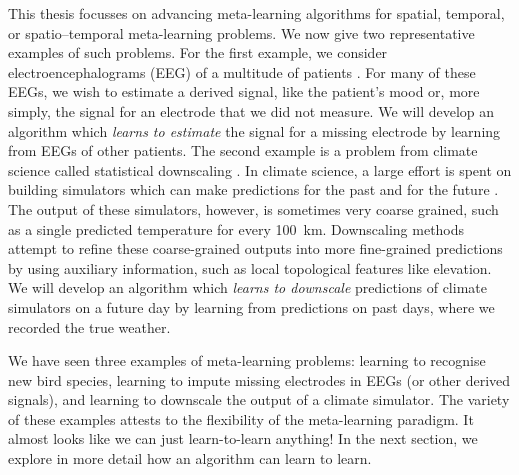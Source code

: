 \documentclass[12pt, twoside]{report}
\begin{document}
This thesis focusses on advancing meta-learning algorithms for spatial, temporal, or spatio--temporal meta-learning problems. %
We now give two representative examples of such problems.
For the first example, we consider electroencephalograms (EEG) of a multitude of patients \parencite{Zhang:1995:Event_Related_Potentials_During_Object}.
For many of these EEGs, we wish to estimate a derived signal, like the patient's mood or, more simply, the signal for an electrode that we did not measure.
We will develop an algorithm which \emph{learns to estimate} the signal for a missing electrode %
by learning from EEGs of other patients.
The second example is a problem from climate science called statistical downscaling \parencite{Maraun:2018:Statistical_Downscaling_and_Bias_Correction}.
In climate science, a large effort is spent on building simulators which can make predictions for the past and for the future \parencite{Dee:2011:The_ERA-Interim_Reanalysis_Configuration_and}.
The output of these simulators, however, is sometimes very coarse grained, such as a single predicted temperature for every \SI{100}{km}. 
Downscaling methods attempt to refine these coarse-grained outputs into more fine-grained predictions by using auxiliary information, such as local topological features like elevation.
We will develop an algorithm which \emph{learns to downscale}
 predictions of climate simulators on a future day by learning from predictions on past days, where we recorded the true weather.

We have seen three examples of meta-learning problems:
learning to recognise new bird species,
learning to impute missing electrodes in EEGs (or other derived signals),
and learning to downscale the output of a climate simulator.
The variety of these examples attests to the flexibility of the meta-learning paradigm.
It almost looks like we can just learn-to-learn anything!
In the next section, we explore in more detail how an algorithm can learn to learn.
\end{document}
